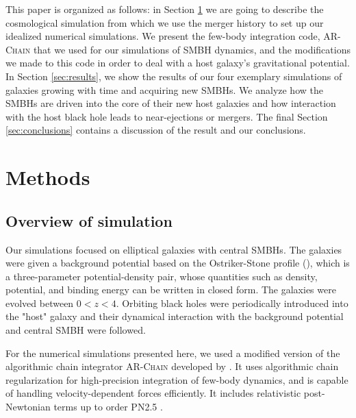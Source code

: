 \documentclass[english, apj]{emulateapj}
\begin{document}
This paper is organized as follows: in Section \ref{sec:methods} we are going to describe the cosmological simulation from which we use the merger history to set up our idealized numerical simulations. We present the few-body integration code, \textsc{AR-Chain} that we used for our simulations of SMBH dynamics, and the modifications we made to this code in order to deal with a host galaxy's gravitational potential. In Section \ref{sec:results}, we show the results of our four exemplary simulations of galaxies growing with time and acquiring new SMBHs. We analyze how the SMBHs are driven into the core of their new host galaxies and how interaction with the host black hole leads to near-ejections or mergers. The final Section \ref{sec:conclusions} contains a discussion of the result and our conclusions.


\section{Methods}\label{sec:methods}

\subsection{Overview of simulation}
Our simulations focused on elliptical galaxies with central SMBHs. The galaxies were given a background potential based on the Ostriker-Stone profile (\citet{2015ApJ...806L..28S}), which is a three-parameter potential-density pair, whose quantities such as density, potential, and binding energy can be written in closed form.  The galaxies were evolved between $0 < z < 4$.  Orbiting black holes were periodically introduced into the "host" galaxy and their dynamical interaction with the background potential and central SMBH were followed.

For the numerical simulations presented here, we used a modified version of the algorithmic chain integrator \textsc{AR-Chain} developed by \citet{2006MNRAS.372..219M}. It uses algorithmic chain regularization for high-precision integration of few-body dynamics, and is capable of handling velocity-dependent forces efficiently. It includes relativistic post-Newtonian terms up to order PN2.5 \citep{2008AJ....135.2398M}.
\end{document}
